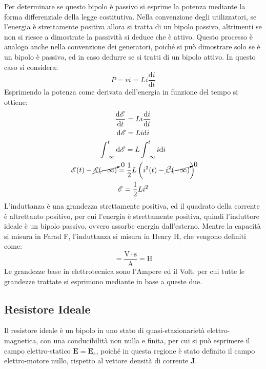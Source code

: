 \documentclass{article}
\newcommand{\vect}[1]{\boldsymbol{\mathbf{#1}}}
\newcommand{\df}{\mathrm{d}}
\newcommand{\SI}[1]{\mathrm{#1}}
\numberwithin{equation}{subsection}
\begin{document}
Per determinare se questo bipolo è passivo si esprime la potenza mediante la forma differenziale della legge costitutiva. Nella convenzione degli utilizzatori, se l'energia 
è strettamente positiva allora si tratta di un bipolo passivo, altrimenti se non si riesce a dimostrate la passività si deduce che è attivo. Questo processo è analogo 
anche nella convenzione dei generatori, poiché si può dimostrare solo se è un bipolo è passivo, ed in caso dedurre se si tratti di un bipolo attivo. In questo caso si 
considera:
\begin{equation*}
    P=vi=Li\displaystyle\frac{\df i}{\df t}
\end{equation*}
Esprimendo la potenza come derivata dell'energia in funzione del tempo si ottiene:
\begin{gather*}
    \displaystyle\frac{\df\mathscr{E}}{\df t}=Li\frac{\df i}{\df t}\\
    \df\mathscr{E}=Li\df i\\
    \displaystyle\int_{-\infty}^t\df\mathscr{E}=L\int_{-\infty}^ti\df i\\
    \mathscr{E}(t)-\cancelto{0}{\mathscr{E}(-\infty)}=\displaystyle\frac{1}{2}L\left(i^2(t)-\cancelto{0}{i^2(-\infty)}\right)\\
    \mathscr{E}=\displaystyle\frac{1}{2}Li^2
\end{gather*}
L'induttanza è una grandezza strettamente positiva, ed il quadrato della corrente è altrettanto positivo, per cui l'energia è strettamente positiva, quindi l'induttore ideale 
è un bipolo passivo, ovvero assorbe energia dall'esterno. 
Mentre la capacità si misura in Farad F, l'induttanza si misura in Henry H, che vengono definiti come:
\begin{equation*}
    [L]=\displaystyle\frac{\SI{V}\cdot \SI{s}}{\SI{A}}=\SI{H}
\end{equation*}
Le grandezze base in elettrotecnica sono l'Ampere ed il Volt, per cui tutte le grandezze trattate si esprimono mediante in base a queste due. 

\subsection{Resistore Ideale}

Il resistore ideale è un bipolo in uno stato di quasi-stazionarietà elettro-magnetica, con una conducibilità non nulla e finita, per cui si può esprimere il campo 
elettro-statico $\vect{E}=\vect{E}_s$, poiché in questa regione è stato definito il campo elettro-motore nullo, rispetto al vettore densità di corrente $\vect{J}$.
\end{document}
